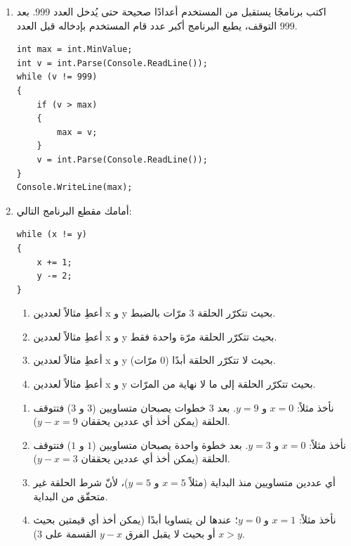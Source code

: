 \documentclass[14pt]{extarticle}
\begin{document}
\begin{enumerate}[itemsep=1em]
\item اكتب برنامجًا يستقبل من المستخدم أعدادًا صحيحة حتى يُدخل العدد $999$. بعد التوقف، يطبع البرنامج أكبر عدد قام المستخدم بإدخاله قبل العدد $999$.
\ifwithsols
\begin{boxSolution}
\begin{english}
\begin{verbatim}
int max = int.MinValue;
int v = int.Parse(Console.ReadLine());
while (v != 999)
{
    if (v > max)
    {
        max = v;
    }
    v = int.Parse(Console.ReadLine());
}
Console.WriteLine(max);
\end{verbatim}
\end{english}
\end{boxSolution}
\fi
\filbreak

\item أمامك مقطع البرنامج التالي:
\begin{boxCode}
\begin{english}
\begin{verbatim}
while (x != y)
{
    x += 1;
    y -= 2;
}
\end{verbatim}
\end{english}
\end{boxCode}
\begin{enumerate}
    \item أعطِ مثالاً لعددين \textenglish{x} و \textenglish{y} بحيث تتكرّر الحلقة $3$ مرّات بالضبط.
    \item أعطِ مثالاً لعددين \textenglish{x} و \textenglish{y} بحيث تتكرّر الحلقة مرّة واحدة فقط.
    \item أعطِ مثالاً لعددين \textenglish{x} و \textenglish{y} بحيث لا تتكرّر الحلقة أبدًا ($0$ مرّات).
    \item أعطِ مثالاً لعددين \textenglish{x} و \textenglish{y} بحيث تتكرّر الحلقة إلى ما لا نهاية من المرّات.
\end{enumerate}
\ifwithsols
\begin{boxSolution}
\begin{enumerate}
    \item نأخذ مثلاً: $x = 0$ و $y = 9$. بعد $3$ خطوات يصبحان متساويين ($3$ و $3$) فتتوقف الحلقة (يمكن أخذ أي عددين يحققان $y - x = 9$).
    \item نأخذ مثلاً: $x = 0$ و $y = 3$. بعد خطوة واحدة يصبحان متساويين ($1$ و $1$) فتتوقف الحلقة (يمكن أخذ أي عددين يحققان $y - x = 3$).
    \item أي عددين متساويين منذ البداية (مثلاً $x = 5$ و $y = 5$)، لأنّ شرط الحلقة غير متحقّق من البداية.
    \item نأخذ مثلاً: $x = 1$ و $y = 0$؛ عندها لن يتساويا أبدًا (يمكن أخذ أي قيمتين بحيث $x > y$ أو بحيث لا يقبل الفرق $y - x$ القسمة على $3$).
\end{enumerate}
\end{boxSolution}
\fi
\filbreak

\end{enumerate}
\end{document}
